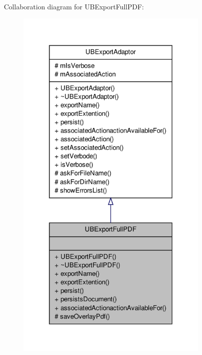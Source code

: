 Collaboration diagram for U\-B\-Export\-Full\-P\-D\-F\-:
\nopagebreak
\begin{figure}[H]
\begin{center}
\leavevmode
\includegraphics[width=266pt]{d4/d73/class_u_b_export_full_p_d_f__coll__graph}
\end{center}
\end{figure}
